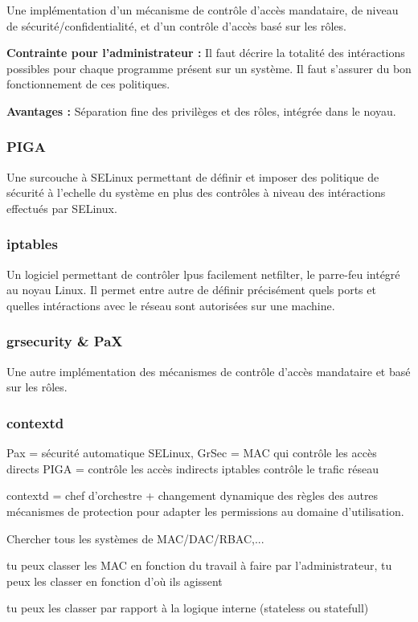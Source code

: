 Une implémentation d'un mécanisme de contrôle d'accès mandataire, de niveau de sécurité/confidentialité, et d'un contrôle d'accès basé sur les rôles.

\begin{list}{}{}
 \item \textbf{Contrainte pour l'administrateur :} Il faut décrire la totalité des intéractions possibles pour chaque programme présent sur un système. Il faut s'assurer du bon fonctionnement de ces politiques.

 \item \textbf{Avantages :} Séparation fine des privilèges et des rôles, intégrée dans le noyau.
\end{list}



\subsubsection{PIGA}

Une surcouche à SELinux permettant de définir et imposer des politique de sécurité à l'echelle du système en plus des contrôles à niveau des intéractions effectués par SELinux.

\subsubsection{iptables}

Un logiciel permettant de contrôler lpus facilement netfilter, le parre-feu intégré au noyau Linux. Il permet entre autre de définir précisément quels ports et quelles intéractions avec le réseau sont autorisées sur une machine.

\subsubsection{grsecurity \& PaX}

Une autre implémentation des mécanismes de contrôle d'accès mandataire et basé sur les rôles.

\subsubsection{contextd}

Pax = sécurité automatique
SELinux, GrSec = MAC qui contrôle les accès directs
PIGA = contrôle les accès indirects
iptables contrôle le trafic réseau

contextd = chef d'orchestre + changement dynamique des règles des autres  mécanismes de protection pour adapter les permissions au domaine d'utilisation.

Chercher tous les systèmes de MAC/DAC/RBAC,...

tu peux classer les MAC en fonction du travail à faire par l'administrateur, tu peux les classer en fonction d'où ils agissent


tu peux les classer par rapport à la logique interne (stateless ou statefull)

